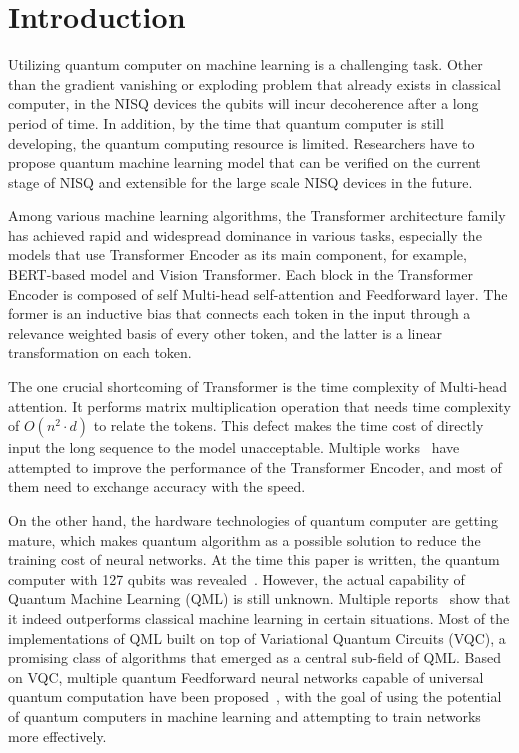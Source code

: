 \section{Introduction}

Utilizing quantum computer on machine learning is a challenging task. Other than the gradient vanishing or exploding problem that already exists in classical computer, in the NISQ devices the qubits will incur decoherence after a long period of time. In addition, by the time that quantum computer is still developing, the quantum computing resource is limited. Researchers have to propose quantum machine learning model that can be verified on the current stage of NISQ and extensible for the large scale NISQ devices in the future.

Among various machine learning algorithms, the Transformer architecture family has achieved rapid and widespread dominance in various tasks, especially the models that use Transformer Encoder as its main component, for example, BERT-based model and Vision Transformer. Each block in the Transformer Encoder is composed of self Multi-head self-attention and Feedforward layer. The former is an inductive bias that connects each token in the input through a relevance weighted basis of every other token, and the latter is a linear transformation on each token.

The one crucial shortcoming of Transformer is the time complexity of Multi-head attention. It performs matrix multiplication operation that needs time complexity of $O(n^2 \cdot d)$ to relate the tokens. This defect makes the time cost of directly input the long sequence to the model unacceptable. Multiple works~\cite{} have attempted to improve the performance of the Transformer Encoder, and most of them need to exchange accuracy with the speed.

On the other hand, the hardware technologies of quantum computer are getting mature, which makes quantum algorithm as a possible solution to reduce the training cost of neural networks. At the time this paper is written, the quantum computer with 127 qubits was revealed~\cite{}. However, the actual capability of Quantum Machine Learning (QML) is still unknown. Multiple reports~\cite{} show that it indeed outperforms classical machine learning in certain situations. Most of the implementations of QML built on top of Variational Quantum Circuits (VQC), a promising class of algorithms that emerged as a central sub-field of QML. Based on VQC, multiple quantum Feedforward neural networks capable of universal quantum computation have been proposed~\cite{}, with the goal of using the potential of quantum computers in machine learning and attempting to train networks more effectively.

